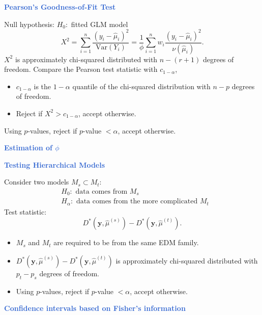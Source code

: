 \documentclass[aspectratio=169,professionalfonts,mathserif,handout]{beamer}
\newcommand{\highlight}[1]{\textcolor{Highlight}{\bf #1}}
\renewcommand{\(}{\left(}
\renewcommand{\)}{\right)}
\renewcommand{\[}{\left[}
\renewcommand{\]}{\right]}
\newcommand{\mytitle}[1]{\vspace*{-1mm}%
  \centerline{\highlight{\Large #1}}\vspace*{3mm}}
\newenvironment{slidebox}{%
  \begin{minipage}[c][7.5cm][t]{14.4cm}\raggedright}{%
  \end{minipage}}
\begin{document}
\begin{frame}\begin{slidebox}
  \mytitle{Pearson's Goodness-of-Fit Test}
  Null hypothesis: $H_0:$ fitted GLM model
  \begin{equation*}
    X^2 = \sum_{i=1}^n \frac{(y_i - \hat{\mu}_i)^2}{\text{Var}(Y_i)} = \frac{1}{\phi} \sum_{i=1}^n w_i \frac{(y_i - \hat{\mu}_i)^2}{\nu(\hat{\mu}_i)} \text{.} 
  \end{equation*}
  $X^2$ is approximately chi-squared distributed with $n - (r+1)$ degrees of freedom.
  \pause
  Compare the Pearson test statistic with $c_{1-\alpha}$, 
  \begin{itemize}
    \item  $c_{1-\alpha}$ is the $1-\alpha$ quantile of the chi-squared distribution with $n-p$ degrees of freedom.
    \item  Reject if $X^2 > c_{1-\alpha}$, accept otherwise.
  \end{itemize}
  \pause
  Using $p$-values, reject if $p$-value $< \alpha$, accept otherwise.

\end{slidebox}\end{frame}

\begin{frame}\begin{slidebox}
  \mytitle{Estimation of $\phi$}
\end{slidebox}\end{frame}

\begin{frame}\begin{slidebox}
  \mytitle{Testing Hierarchical Models}
  Consider two models $M_s \subset M_t$:
  \begin{align*}
    & H_0: \text{ data comes from } M_s \\
    & H_\alpha: \text{ data comes from the more complicated } M_t 
  \end{align*}
  \pause
  Test statistic:
  \begin{equation*}
    D^*(\mathbf{y}, \hat{\mu}^{(s)}) - D^*(\mathbf{y}, \hat{\mu}^{(t)}) \text{.}
  \end{equation*}
  \pause
  \begin{itemize}
    \item   $M_s$ and $M_t$ are required to be from the same EDM family.
    \pause
    \item   $D^*(\mathbf{y}, \hat{\mu}^{(s)}) - D^*(\mathbf{y}, \hat{\mu}^{(t)})$ is approximately chi-squared distributed with $p_t - p_s$ degrees of freedom.
    \pause
    \item   Using $p$-values, reject if $p$-value $< \alpha$, accept otherwise.
  \end{itemize}
\end{slidebox}\end{frame}

\begin{frame}\begin{slidebox}
  \mytitle{Confidence intervals based on Fisher’s information}
\end{slidebox}\end{frame}
\end{document}
